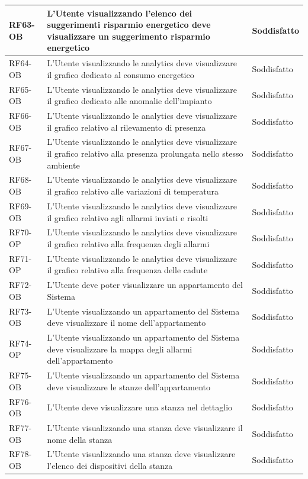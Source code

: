 \begin{longtable}{|p{2.5cm}|p{9cm}|p{3cm}|}
\hline
RF63-OB & L'Utente visualizzando l'elenco dei suggerimenti risparmio energetico deve visualizzare un suggerimento risparmio energetico & Soddisfatto \\
\hline
RF64-OB & L'Utente visualizzando le analytics deve visualizzare il grafico dedicato al consumo energetico & Soddisfatto \\
\hline
RF65-OB & L'Utente visualizzando le analytics deve visualizzare il grafico dedicato alle anomalie dell'impianto & Soddisfatto \\
\hline
RF66-OB & L'Utente visualizzando le analytics deve visualizzare il grafico relativo al rilevamento di presenza & Soddisfatto \\
\hline
RF67-OB & L'Utente visualizzando le analytics deve visualizzare il grafico relativo alla presenza prolungata nello stesso ambiente & Soddisfatto \\
\hline
RF68-OB & L'Utente visualizzando le analytics deve visualizzare il grafico relativo alle variazioni di temperatura & Soddisfatto \\
\hline
RF69-OB & L'Utente visualizzando le analytics deve visualizzare il grafico relativo agli allarmi inviati e risolti & Soddisfatto \\
\hline
RF70-OP & L'Utente visualizzando le analytics deve visualizzare il grafico relativo alla frequenza degli allarmi & Soddisfatto \\
\hline
RF71-OP & L'Utente visualizzando le analytics deve visualizzare il grafico relativo alla frequenza delle cadute & Soddisfatto \\
\hline
RF72-OB & L'Utente deve poter visualizzare un appartamento del Sistema & Soddisfatto \\
\hline
RF73-OB & L'Utente visualizzando un appartamento del Sistema deve visualizzare il nome dell'appartamento & Soddisfatto \\
\hline
RF74-OP & L'Utente visualizzando un appartamento del Sistema deve visualizzare la mappa degli allarmi dell'appartamento & Soddisfatto \\
\hline
RF75-OB & L'Utente visualizzando un appartamento del Sistema deve visualizzare le stanze dell'appartamento & Soddisfatto \\
\hline
RF76-OB & L'Utente deve visualizzare una stanza nel dettaglio & Soddisfatto \\
\hline
RF77-OB & L'Utente visualizzando una stanza deve visualizzare il nome della stanza & Soddisfatto \\
\hline
RF78-OB & L'Utente visualizzando una stanza deve visualizzare l'elenco dei dispositivi della stanza & Soddisfatto \\

\end{longtable}
